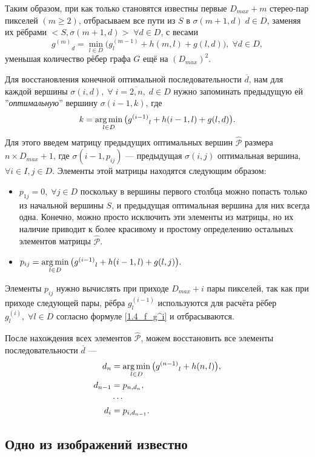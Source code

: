 Таким образом, при как только становятся известны первые $D_{max}+m$ стерео-пар пикселей $( m \geqslant 2)$, отбрасываем все пути из $S$ в 
$\sigma(m+1, d) \; d \in D$, заменяя их рёбрами $<S, \sigma(m+1, d) > \; \forall d \in D$, с весами 
\begin{equation}\label{1.4_f_g^i}
{g^{(m)}}_d = \min\limits_{l \in D}{\big( g^{(m-1)}_l + h(m, l) + g(l, d) \big) },  \; \forall d \in D,
\end{equation}
уменьшая количество рёбер графа $G$ ещё на $(D_{max})^2$.
\newpage

Для восстановления конечной оптимальной последовательности $\overline{d}$, нам для каждой вершины $\sigma(i, d), \; \forall \;	i = \overline{2, n}, \; d \in D$ нужно запоминать предыдущую ей ''\textit{оптимальную}'' вершину $\sigma(i-1, k)$, где 
$$k = \operatorname*{arg\,min}\limits_{l \in D}{\big( {g^{(i-1)}}_l + h(i-1, l) + g(l, d) \big) }.$$
Для этого введем матрицу предыдущих оптимальных вершин $\hat{\mathcal{P}}$ размера \\
$n \times D_{max} + 1$, где $\sigma(i-1, p_{ij}) $ --- предыдущая $\sigma(i, j)$ оптимальная вершина, \\
$\forall i \in I, j \in D$. Элементы этой матрицы находятся следующим образом:
\begin{itemize}
\item $p_{1j} = 0, \; \forall j \in D$ поскольку в вершины первого столбца можно попасть только из начальной вершины $S$, и предыдущая оптимальная вершина для них всегда одна. Конечно, можно просто исключить эти элементы из матрицы, но их наличие приводит к более красивому и простому определению остальных элементов матрицы 
$\hat{\mathcal{P}}$.
\item $p_{ij} = \operatorname*{arg\,min}\limits_{l \in D}{\big( {g^{(i-1)}}_l + h(i-1, l) + g(l, j) \big) }.$
\end{itemize}
Элементы $p_{ij}$ нужно вычислять при приходе $D_{max} + i$ пары пикселей, так как при приходе следующей пары, рёбра $ g^{(i-1)}_l $ используются  
для расчёта рёбер $ g^{(i)}_l, \; \forall l \in D $ согласно формуле \ref{1.4_f_g^i} и отбрасываются.

После нахождения всех элементов $\hat{\mathcal{P}}$, можем восстановить все элементы последовательности $\overline{d}$ ---
\begin{align*}
d_n &= \operatorname*{arg\,min}\limits_{l \in D}  {\big( {g^{(n-1)}}_l + h(n, l) \big) }, \\
d_{n-1} &= p_{n,d_n},\\
&\cdots\\
d_i &= p_{i,d_{n-1}}.
\end{align*}



\subsection{Одно из изображений известно}

























